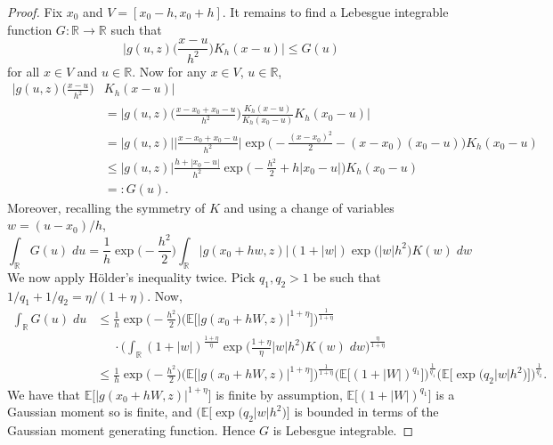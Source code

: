 \documentclass[aos]{imsart}
\newcommand{\R}{\mathbb{R}}
\newcommand{\E}{\mathbb{E}}
\begin{document}
\begin{proof}
		Fix $x_0$ and $V=[x_0-h, x_0+h]$. It remains to find a Lebesgue integrable function $G:\R\to\R$ such that \begin{equation*}
			\bigg| g(u,z) \bigg(\frac{x-u}{h^2}\bigg) K_h(x-u) \bigg| \leq G(u)
		\end{equation*}
		for all $x\in V$ and $u\in\R$. Now for any $x\in V$, $u\in\R$,
		\begin{align*}
			\bigg| g(u,z) \bigg(\frac{x-u}{h^2}\bigg) &K_h(x-u) \bigg| \\ &=\bigg| g(u,z) \bigg(\frac{x-x_0+x_0-u}{h^2}\bigg) \frac{K_h(x-u)}{K_h(x_0-u)}K_h(x_0-u) \bigg|\\
			&= | g(u,z)| \bigg|\frac{x-x_0+x_0-u}{h^2}\bigg| \exp\bigg(-\frac{(x-x_0)^2}{2} - (x-x_0)(x_0-u)\bigg) K_h(x_0-u) \\
			&\leq |g(u,z)| \frac{h+|x_0-u|}{h^2} \exp\bigg(-\frac{h^2}2 + h|x_0-u|\bigg) K_h(x_0-u)\\
			&=:G(u).
		\end{align*}
		Moreover, recalling the symmetry of $K$ and using a change of variables $w=(u-x_0)/h$, \begin{equation*}
			\int_\R G(u)\; du = \frac1h \exp\bigg(-\frac{h^2}{2}\bigg) \int_\R |g(x_0+hw,z)| (1+|w|) \exp\big(|w|h^2\big)K(w)\;dw
		\end{equation*}
		We now apply H\"older's inequality twice. Pick $q_1, q_2 > 1$ be such that $1/q_1 + 1/q_2 = \eta/(1+\eta)$. Now,
		\begin{align*}
			\int_\R G(u)\; du &\leq \frac1h \exp\bigg(-\frac{h^2}{2}\bigg) \Big(\E\big[|g(x_0+hW,z)|^{1+\eta}\big]\Big)^{\frac1{1+\eta}} \\
			& \phantom{\leq} \cdot \bigg(\int_\R (1+|w|)^{\frac{1+\eta}{\eta}} \exp\bigg({\frac{1+\eta}{\eta}}|w|h^2\bigg)K(w)\;dw\bigg)^{\frac{\eta}{1+\eta}}\\
			&\leq \frac1h  \exp\bigg(-\frac{h^2}{2}\bigg) \Big(\E\big[|g(x_0+hW,z)|^{1+\eta}\big]\Big)^{\frac1{1+\eta}} \Big(\E\big[(1+|W|)^{q_1}\big]\Big)^{\frac1{q_1}} \Big(\E\big[ \exp\big(q_2|w|h^2\big)\big]\Big)^{\frac{1}{q_2}}.
		\end{align*}
		We have that $\E\big[|g(x_0+hW,z)|^{1+\eta}\big]$ is finite by assumption, $\E\big[(1+|W|)^{q_1}\big]$ is a Gaussian moment so is finite, and $(\E\big[ \exp\big(q_2|w|h^2\big)\big]$ is bounded in terms of the Gaussian moment generating function. Hence $G$ is Lebesgue integrable.
		
		
		

\end{proof}
\end{document}

